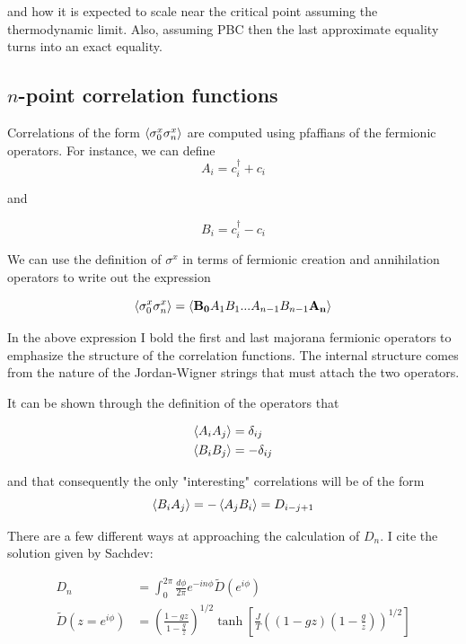 \documentclass{article}
\begin{document}
and how it is expected to scale near the critical point assuming the thermodynamic limit. Also, assuming PBC then the last approximate equality turns into an exact equality.

\subsection{$n$-point correlation functions}


Correlations of the form $\braket{\sigma^x_0 \sigma^x_n}$ are computed using pfaffians of the fermionic operators. For instance, we can define 
\begin{equation}
    A_i = c^\dagger_i+c_i
\end{equation}

and 

\begin{equation}
    B_i = c^\dagger_i - c_i
\end{equation}

We can use the definition of $\sigma^x$ in terms of fermionic creation and annihilation operators to write out the expression

\begin{equation}
    \braket{\sigma^x_0 \sigma^x_n } = \braket{\mathbf{B_0}A_{1}B_{1}...A_{n-1}B_{n-1}\mathbf{A_n}}
\end{equation}

In the above expression I bold the first and last majorana fermionic operators to emphasize the structure of the correlation functions. The internal structure comes from the nature of the Jordan-Wigner strings that must attach the two operators.

It can be shown through the definition of the operators that 

\begin{align}
    \braket{A_i A_j} &= \delta_{ij} \\
    \braket{B_i B_j} &= -\delta_{ij}   
\end{align}

and that consequently the only "interesting" correlations will be of the form
\begin{equation}
    \braket{B_i A_j} = -\braket{A_j B_i} = D_{i-j+1}
\end{equation}

There are a few different ways at approaching the calculation of $D_n$. I cite the solution given by Sachdev:

\begin{align}
    D_n &= \int_{0}^{2\pi} \frac{d\phi}{2\pi} e^{-in\phi} \tilde{D}(e^{i\phi}) \\
    \tilde{D}(z= e^{i\phi}) &= \left( \frac{1 - g z}{1 - \frac{g}{z}} \right)^{1/2} 
    \tanh \left[ \frac{J}{T} \left( (1 - g z)\left(1 - \frac{g}{z} \right) \right)^{1/2} \right]
\end{align}
\end{document}
